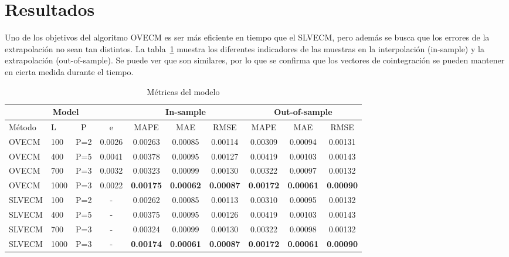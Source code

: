 \section{Resultados}
Uno de los objetivos del algoritmo OVECM es ser más eficiente en tiempo 
que el SLVECM, pero además se busca que los errores de la extrapolación
no sean tan distintos. La tabla~\ref{tab:mapes} muestra los diferentes
indicadores de las muestras en la interpolación (in-sample) y la extrapolación 
(out-of-sample). Se puede ver que son similares, por lo que se confirma que los
vectores de cointegración se pueden mantener en cierta medida durante el tiempo.

\begin{table}[ht!]
\caption{Métricas del modelo}
\label{tab:mapes}
\begin{center}
\begin{adjustbox}{max width=\textwidth}
\begin{tabular}{|l|l|c|c|c|c|c|c|c|c|}
\hline
\multicolumn{4}{|c|}{Model} & \multicolumn{3}{|c|}{In-sample} &
\multicolumn{3}{|c|}{Out-of-sample} \\ 
\hline
\hline
Método & L & P & e &
MAPE & MAE& RMSE&
MAPE & MAE& RMSE \\
\hline
 OVECM  &   100  &  P=2& 0.0026  &  0.00263&  0.00085&  0.00114&  0.00309&  0.00094&  0.00131\\
 OVECM  &   400  &  P=5& 0.0041  &  0.00378&  0.00095&  0.00127&  0.00419&  0.00103&  0.00143\\
 OVECM  &   700  &  P=3& 0.0032  &  0.00323&  0.00099&  0.00130&  0.00322&  0.00097&  0.00132\\
 OVECM  &   1000 &  P=3& 0.0022  &
 \textbf{0.00175}&  \textbf{0.00062}&  \textbf{0.00087} &
 \textbf{0.00172}&  \textbf{0.00061}&  \textbf{0.00090}\\
\hline
 SLVECM  &   100 &  P=2& -  &  0.00262&  0.00085&  0.00113&  0.00310&  0.00095&  0.00132\\
 SLVECM  &   400 &  P=5& -  &  0.00375&  0.00095&  0.00126&  0.00419&  0.00103&  0.00143\\
 SLVECM  &   700 &  P=3& -  &  0.00324&  0.00099&  0.00130&  0.00322&  0.00098&  0.00132\\
 SLVECM  &   1000 &  P=3& -  &
 \textbf{0.00174}&  \textbf{0.00061}&  \textbf{0.00087}&
 \textbf{0.00172}&  \textbf{0.00061}&  \textbf{0.00090}\\
\hline
\end{tabular}
\end{adjustbox}
\end{center}
\end{table}

